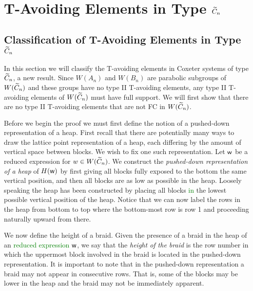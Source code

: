 \chapter{T-Avoiding Elements in Type $\widetilde{C}_n$}\label{chap:Cn}



\section{Classification of T-Avoiding Elements in Type $\widetilde{C}_n$}\label{sec:TAC}

In this section we will classify the T-avoiding elements in Coxeter systems of type $\widetilde{C}_n$, a new result. Since $W(A_n)$ and $W(B_n)$ are parabolic subgroups of $W(\widetilde{C}_n)$ and these groups have no type II T-avoiding elements,  any type II T-avoiding elements of $W(\widetilde{C}_n)$ must have full support. We will first show that there are no type II T-avoiding elements that are not FC in $W(\widetilde{C}_n)$.

Before we begin the proof we must first define the notion of a pushed-down representation of a heap. First recall that there are potentially many ways to draw the lattice point representation of a heap, each differing by the amount of vertical space between blocks. We wish to fix one such representation. Let $\mathsf{w}$ be a reduced expression for $w \in W(\widetilde{C}_n)$. We construct the \emph{pushed-down representation of a heap} of $H(\mathsf{w})$ by first giving all blocks fully exposed to the bottom the same vertical position, and then all blocks are as low as possible in the heap. Loosely speaking the heap has been constructed by placing all blocks \textcolor{green}{in} the lowest possible vertical position of the heap. Notice that we can now label the rows in the heap from bottom to top where the bottom-most row is row 1 and proceeding naturally upward from there. 

We now define the height of a braid. Given the presence of a braid in the heap of an \textcolor{green}{reduced expression} $\mathsf{w}$, we say that the \emph{height of the braid} is the row number in which the uppermost block involved in the braid is located in the pushed-down representation. It is important to note that in the pushed-down representation a braid may not appear in consecutive rows. That is, some of the blocks may be lower in the heap and the braid may not be immediately apparent. 

